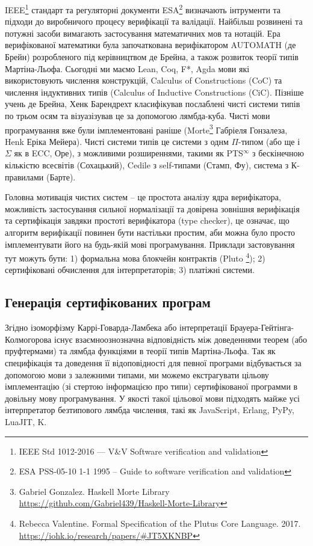IEEE\footnote{IEEE Std 1012-2016  --- V\&V Software verification and validation} стандарт
та регуляторні документи ESA\footnote{ESA PSS-05-10 1-1 1995 -- Guide to software verification and validation}
визначають інтрументи та підходи до виробничого процесу верифікації та валідації.
Найбільш розвинені та потужні засоби вимагають застосування математичних мов та нотацій.
Ера верифікованої математики була започаткована верифікатором AUTOMATH\cite{deBruijn83} (де Брейн) розробленого
під керівництвом де Брейна, а також розвиток теорії типів Мартіна-Льофа\cite{Lof84}.
Сьогодні ми маємо Lean, Coq, F*, Agda мови які використовують числення
конструкцій, Calculus of Constructions\cite{Coq88} (CoC)
та числення індуктивних типів (Calculus of Inductive Constructions\cite{Pfenning89} (CiC).
Пізніше учень де Брейна, Хенк Барендрехт класифікував послаблені чисті
системи типів по трьом осям та візуазізував це за допомогою лямбда-куба\cite{Henk93}.
Чисті мови програмування вже були імплементовані раніше
(Morte\footnote{Gabriel Gonzalez. Haskell Morte Library \url{https://github.com/Gabriel439/Haskell-Morte-Library}} Габріеля Гонзалеза, Henk\cite{Erik97} Еріка Мейера).
Чисті системи типів це системи з однм $\Pi$-типом (або ще і $\Sigma$ як в ECC\cite{Ore92}, Оре),
з можливими розширеннями, такими як PTS$^\infty$ з бескінечною кількістю всесвітів\cite{Tonpa18} (Сохацький),
Cedile з self-типами\cite{Fu14}\cite{Stump17} (Стамп, Фу), система з К-правилами\cite{Barthe95} (Барте).

Головна мотивація чистих систем -- це простота аналізу ядра верифікатора,
можливість застосування сильної нормалізації та довірена зовнішня верифікація
та сертифікація завдяки простоті верифікатора (type checker), це означає, що
алгоритм верифікації повинен бути настільки простим, аби можна було
просто імплементувати його на будь-якій мові програмування. Приклади застовування
тут можуть бути:
1) формальна мова блокчейн контрактів (Pluto
   \footnote{Rebecca Valentine. Formal Specification of the Plutus Core Language. 2017.
             \url{https://iohk.io/research/papers/#JT5XKNBP}});
2) сертифіковані обчислення для інтерпретаторів;
3) платіжні системи.

\subsection{Генерація сертифікованих програм}
Згідно ізоморфізму Каррі-Говарда-Ламбека або інтерпретації Брауера-Гейтінга-Колмогорова
існує взаємноознозначна відповідність між доведеннями теорем (або пруфтермами)
та лямбда функціями в теорії типів Мартіна-Льофа\cite{Lof84}.
Так як специфікація та доведення її відоповідності для певної програми
відбувається за допомогою мови з залежними типами, ми можемо екстрагувати
цільову імплементацію (зі стертою інформацією про типи) сертифікованої программи
в довільну мову програмування. У якості такої цільової мови підходять
майже усі інтерпретатор безтипового лямбда числення, такі як JavaScript,
Erlang, PyPy, LuaJIT, K.

